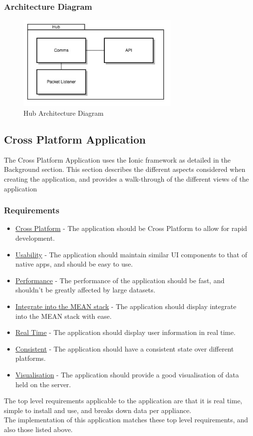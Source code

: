 \documentclass[preprint,12pt,3p]{elsarticle}
\begin{document}
\subsubsection{Architecture Diagram}
\begin{figure}[H]
    \centering
    \includegraphics[width=8cm]{diagrams/hub}
    \caption {Hub Architecture Diagram}
\end{figure}


\clearpage
\subsection{Cross Platform Application}
The Cross Platform Application uses the Ionic framework as detailed in the Background section. This section describes the different aspects considered when creating the application, and provides a walk-through of the different views of the application
\subsubsection{Requirements}
\begin{itemize}
\item \underline{Cross Platform} - The application should be Cross Platform to allow for rapid development.
\item \underline{Usability} - The application should maintain similar UI components to that of native apps, and should be easy to use.
\item \underline{Performance} - The performance of the application should be fast, and shouldn't be greatly affected by large datasets.
\item \underline{Integrate into the MEAN stack} - The application should display integrate into the MEAN stack with ease.
\item \underline{Real Time} - The application should display user information in real time.
\item \underline{Consistent} - The application should have a consistent state over different platforms.
\item \underline{Visualisation} - The application should provide a good visualisation of data held on the server.
\end{itemize}
The top level requirements applicable to the application are that it is real time, simple to install and use, and breaks down data per appliance.\\
The implementation of this application matches these top level requirements, and also those listed above.
\end{document}

